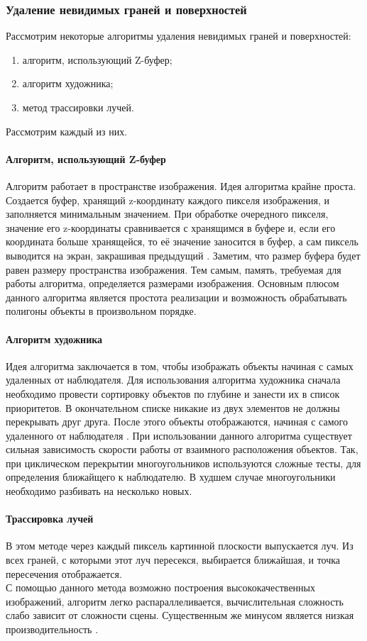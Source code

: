 \documentclass{article}
\begin{document}
	\subsubsection{Удаление невидимых граней и поверхностей}
	\indent Рассмотрим некоторые алгоритмы удаления невидимых граней и поверхностей:
	\begin{enumerate}
		\item алгоритм, использующий Z-буфер;
		\item алгоритм художника;
		\item метод трассировки лучей.
	\end{enumerate}
	Рассмотрим каждый из них.
	\paragraph{ Алгоритм, использующий Z-буфер}
	\indent Алгоритм работает в пространстве изображения. Идея алгоритма крайне проста. Создается буфер, хранящий z-координату каждого пикселя изображения, и заполняется минимальным значением. При обработке очередного пикселя, значение его z-координаты сравнивается с хранящимся в буфере и, если его координата больше хранящейся, то её значение заносится в буфер, а сам пиксель выводится на экран, закрашивая предыдущий \cite{z-buf}.
	\indent Заметим, что размер буфера будет равен размеру пространства изображения. Тем самым, память, требуемая для работы алгоритма, определяется размерами изображения. Основным плюсом данного алгоритма является простота реализации и возможность обрабатывать полигоны объекты в произвольном порядке.
	\paragraph{ Алгоритм художника}
	\indent Идея алгоритма заключается в том, чтобы изображать объекты начиная с самых удаленных от наблюдателя. Для использования алгоритма художника сначала необходимо провести сортировку объектов по глубине и занести их в список приоритетов. В окончательном списке никакие из двух элементов не должны перекрывать друг друга. После этого объекты отображаются, начиная с самого удаленного от наблюдателя \cite{drawerAlg}.
	\indent При использовании данного алгоритма существует сильная зависимость скорости работы от взаимного расположения объектов. Так, при циклическом перекрытии многоугольников используются сложные тесты, для определения ближайщего к наблюдателю. В худшем случае многоугольники необходимо разбивать на несколько новых.
	\paragraph{ Трассировка лучей }
	\indent В этом методе через каждый пиксель картинной плоскости выпускается луч. Из всех граней, с которыми этот луч пересекся, выбирается ближайшая, и точка пересечения отображается.
	\\ \indent С помощью данного метода возможно построения высококачественных изображений, алгоритм легко распараллеливается, вычислительная сложность слабо зависит от сложности сцены. Существенным же минусом является низкая производительность \cite{ray-tracing}.
\end{document}
